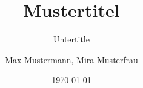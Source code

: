 \author{
	Max Mustermann,
	Mira Musterfrau
}
\titlehead{Fachbereich}
\subject{Grund der Arbeit}
\title{Mustertitel}
\subtitle{Untertitle}
\date{\today}
